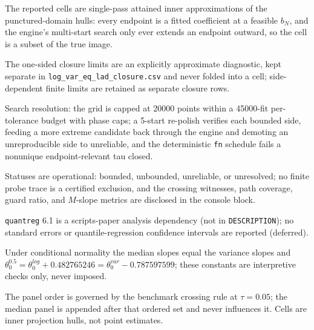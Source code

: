 \documentclass[11pt]{article}
\begin{document}
\begin{table}[!htbp]
\begin{threeparttable}
\begin{tablenotes}[flushleft]
\item The reported cells are single-pass attained inner approximations of the punctured-domain hulls: every endpoint is a fitted coefficient at a feasible $b_N$, and the engine's multi-start search only ever extends an endpoint outward, so the cell is a subset of the true image.
\item The one-sided closure limits are an explicitly approximate diagnostic, kept separate in \texttt{log\_var\_eq\_lad\_closure.csv} and never folded into a cell; side-dependent finite limits are retained as separate closure rows.
\item Search resolution: the grid is capped at 20000 points within a 45000-fit per-tolerance budget with phase caps; a 5-start re-polish verifies each bounded side, feeding a more extreme candidate back through the engine and demoting an unreproducible side to unreliable, and the deterministic \texttt{fn} schedule fails a nonunique endpoint-relevant tau closed.
\item Statuses are operational: bounded, unbounded, unreliable, or unresolved; no finite probe trace is a certified exclusion, and the crossing witnesses, path coverage, guard ratio, and $M$-slope metrics are disclosed in the console block.
\item \texttt{quantreg} 6.1 is a scripts-paper analysis dependency (not in \texttt{DESCRIPTION}); no standard errors or quantile-regression confidence intervals are reported (deferred).
\item Under conditional normality the median slopes equal the variance slopes and $\theta^{0.5}_0 = \theta^{log}_0 + 0.482765246 = \theta^{var}_0 - 0.787597599$; these constants are interpretive checks only, never imposed.
\item The panel order is governed by the benchmark crossing rule at $\tau{=}0.05$; the median panel is appended after that ordered set and never influences it. Cells are inner projection hulls, not point estimates.
\end{tablenotes}
\end{threeparttable}
\end{table}
\end{document}
